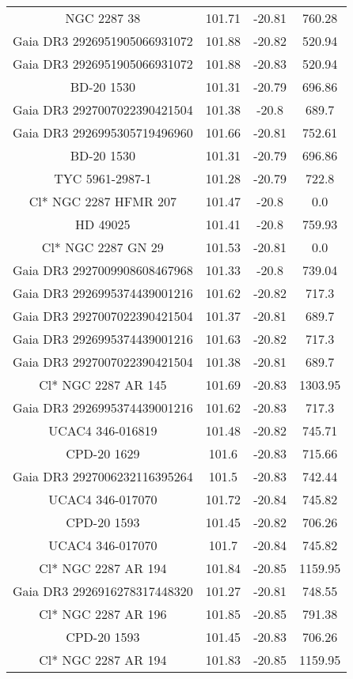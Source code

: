 \begin{table}
\begin{tabular}{cccc}
NGC  2287    38 & 101.71 & -20.81 & 760.28 \\
Gaia DR3 2926951905066931072 & 101.88 & -20.82 & 520.94 \\
Gaia DR3 2926951905066931072 & 101.88 & -20.83 & 520.94 \\
BD-20  1530 & 101.31 & -20.79 & 696.86 \\
Gaia DR3 2927007022390421504 & 101.38 & -20.8 & 689.7 \\
Gaia DR3 2926995305719496960 & 101.66 & -20.81 & 752.61 \\
BD-20  1530 & 101.31 & -20.79 & 696.86 \\
TYC 5961-2987-1 & 101.28 & -20.79 & 722.8 \\
Cl* NGC 2287   HFMR     207 & 101.47 & -20.8 & 0.0 \\
HD  49025 & 101.41 & -20.8 & 759.93 \\
Cl* NGC 2287     GN      29 & 101.53 & -20.81 & 0.0 \\
Gaia DR3 2927009908608467968 & 101.33 & -20.8 & 739.04 \\
Gaia DR3 2926995374439001216 & 101.62 & -20.82 & 717.3 \\
Gaia DR3 2927007022390421504 & 101.37 & -20.81 & 689.7 \\
Gaia DR3 2926995374439001216 & 101.63 & -20.82 & 717.3 \\
Gaia DR3 2927007022390421504 & 101.38 & -20.81 & 689.7 \\
Cl* NGC 2287     AR     145 & 101.69 & -20.83 & 1303.95 \\
Gaia DR3 2926995374439001216 & 101.62 & -20.83 & 717.3 \\
UCAC4 346-016819 & 101.48 & -20.82 & 745.71 \\
CPD-20  1629 & 101.6 & -20.83 & 715.66 \\
Gaia DR3 2927006232116395264 & 101.5 & -20.83 & 742.44 \\
UCAC4 346-017070 & 101.72 & -20.84 & 745.82 \\
CPD-20  1593 & 101.45 & -20.82 & 706.26 \\
UCAC4 346-017070 & 101.7 & -20.84 & 745.82 \\
Cl* NGC 2287     AR     194 & 101.84 & -20.85 & 1159.95 \\
Gaia DR3 2926916278317448320 & 101.27 & -20.81 & 748.55 \\
Cl* NGC 2287     AR     196 & 101.85 & -20.85 & 791.38 \\
CPD-20  1593 & 101.45 & -20.83 & 706.26 \\
Cl* NGC 2287     AR     194 & 101.83 & -20.85 & 1159.95 \\

\end{tabular}
\end{table}
